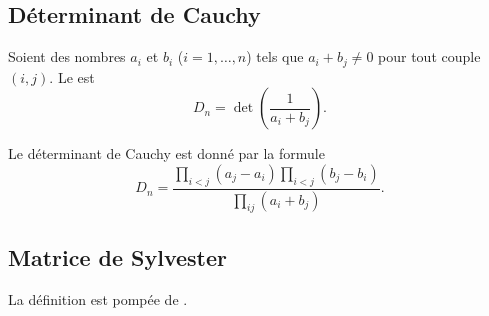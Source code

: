 \subsection{Déterminant de Cauchy}

Soient des nombres \( a_i\) et \( b_i\) (\( i=1,\ldots, n\)) tels que \( a_i+b_j\neq 0\) pour tout couple \( (i,j)\). Le  est 
\begin{equation}
    D_n=\det\left( \frac{1}{ a_i+b_j } \right).
\end{equation}

\begin{proposition} \label{ProptoDYKA}
    Le déterminant de Cauchy est donné par la formule
    \begin{equation}
        D_n=\frac{ \prod_{i<j}(a_j-a_i)\prod_{i<j}(b_j-b_i) }{ \prod_{ij}(a_i+b_j) }.
    \end{equation}
\end{proposition}

\subsection{Matrice de Sylvester}
\label{subsecSQBJfr}

La définition est pompée de .

